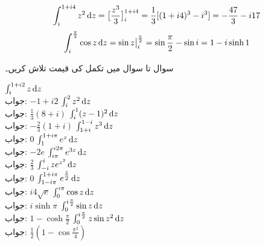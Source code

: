 \quad
\begin{align*}
\int_i^{1+i4} z^2\dif z=\big[\frac{z^3}{3}\big]_i^{1+i4}=\frac{1}{3}[(1+i4)^3-i^3]=-\frac{47}{3}-i17
\end{align*}
\begin{align*}
\int_i^{\frac{\pi}{2}} \cos z\dif z= \sin z \big|_{i}^{\frac{\pi}{2}}=\sin \frac{\pi}{2}-\sin i=1-i\sinh 1
\end{align*}

سوال  تا سوال  میں تکمل کی قیمت تلاش کریں۔

\quad
$\int_{i}^{1+i2} z\dif z$\\
جواب:\quad
$-1+i2$
\quad
$\int_{i}^{2} z^2\dif z$\\
جواب:\quad
$\tfrac{1}{3}(8+i)$
\quad
$\int_{i}^{1} (z-1)^2\dif z$\\
جواب:\quad
$-\tfrac{2}{3}(1+i)$
\quad
$\int_{1+i}^{1-i} z^3\dif z$\\
جواب:\quad
$0$
\quad
$\int_{1}^{1+i\pi} e^z\dif z$\\
جواب:\quad
$-2e$
\quad
$\int_{i\pi}^{i2\pi} e^{3z}\dif z$\\
جواب:\quad
$\tfrac{2}{3}$
\quad
$\int_{-i}^{i} ze^{z^2}\dif z$\\
جواب:\quad
$0$
\quad
$\int_{1-i\pi}^{1+i\pi} e^{\tfrac{z}{2}}\dif z$\\
جواب:\quad
$i4\sqrt{e}$
\quad
$\int_{0}^{i\pi} \cos z\dif z$\\
جواب:\quad
$i\sinh \pi$
\quad
$\int_{0}^{i\frac{\pi}{2}} \sin z\dif z$\\
جواب:\quad
$1-\cosh \frac{\pi}{2}$
\quad
$\int_{0}^{i\frac{\pi}{2}} z\sin z^2\dif z$\\
جواب:\quad
$\tfrac{1}{2}(1-\cos \frac{\pi^2}{4})$

